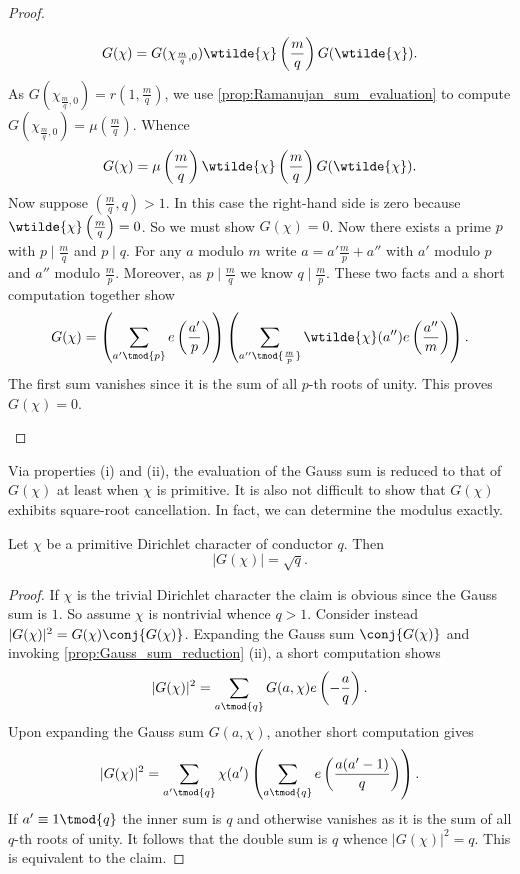 \documentclass[12pt]{article}
\begin{document}
\begin{proof}
\begin{enumerate}[label*=(\roman*)]
          \[
            G(\chi) = G(\chi_{\frac{m}{q},0})\wtilde{\chi}\left(\frac{m}{q}\right)G(\wtilde{\chi}).
          \]
          As \(G(\chi_{\frac{m}{q},0}) = r\left(1,\frac{m}{q}\right)\), we use \cref{prop:Ramanujan_sum_evaluation} to compute \(G(\chi_{\frac{m}{q},0}) = \mu\left(\frac{m}{q}\right)\). Whence
          \[
            G(\chi) = \mu\left(\frac{m}{q}\right)\wtilde{\chi}\left(\frac{m}{q}\right)G(\wtilde{\chi}).
          \]
          Now suppose \(\left(\frac{m}{q},q\right) > 1\). In this case the right-hand side is zero because \(\wtilde{\chi}\left(\frac{m}{q}\right) = 0\). So we must show \(G(\chi) = 0\). Now there exists a prime \(p\) with \(p \mid \frac{m}{q}\) and \(p \mid q\). For any \(a\) modulo \(m\) write \(a = a'\frac{m}{p}+a''\) with \(a'\) modulo \(p\) and \(a''\) modulo \(\frac{m}{p}\). Moreover, as \(p \mid \frac{m}{q}\) we know \(q \mid \frac{m}{p}\). These two facts and a short computation together show
          \[
            G(\chi) = \left(\sum_{a' \tmod{p}}e\left(\frac{a'}{p}\right)\right)\left(\sum_{a'' \tmod{\frac{m}{p}}}\wtilde{\chi}(a'')e\left(\frac{a''}{m}\right)\right).
          \] 
          The first sum vanishes since it is the sum of all \(p\)-th roots of unity. This proves \(G(\chi) = 0\).
        \end{enumerate}
      \end{proof}

      Via properties (i) and (ii), the evaluation of the Gauss sum is reduced to that of \(G(\chi)\) at least when \(\chi\) is primitive. It is also not difficult to show that \(G(\chi)\) exhibits square-root cancellation. In fact, we can determine the modulus exactly.

      \begin{theorem}\label{thm:Gauss_sum_modulus}
        Let \(\chi\) be a primitive Dirichlet character of conductor \(q\). Then
        \[
          |G(\chi)| = \sqrt{q}.
        \]
      \end{theorem}
      \begin{proof}
        If \(\chi\) is the trivial Dirichlet character the claim is obvious since the Gauss sum is \(1\). So assume \(\chi\) is nontrivial whence \(q > 1\). Consider instead \(|G(\chi)|^{2} = G(\chi)\conj{G(\chi)}\). Expanding the Gauss sum \(\conj{G(\chi)}\) and invoking \cref{prop:Gauss_sum_reduction} (ii), a short computation shows
        \[
          |G(\chi)|^{2} = \sum_{a \tmod{q}}G(a,\chi)e\left(-\frac{a}{q}\right).
        \]
        Upon expanding the Gauss sum \(G(a,\chi)\), another short computation gives
        \[
          |G(\chi)|^{2} = \sum_{a' \tmod{q}}\chi(a')\left(\sum_{a \tmod{q}}e\left(\frac{a(a'-1)}{q}\right)\right).
        \]
        If \(a' \equiv 1 \tmod{q}\) the inner sum is \(q\) and otherwise vanishes as it is the sum of all \(q\)-th roots of unity. It follows that the double sum is \(q\) whence \(|G(\chi)|^{2} = q\). This is equivalent to the claim.
      \end{proof}
\end{document}
